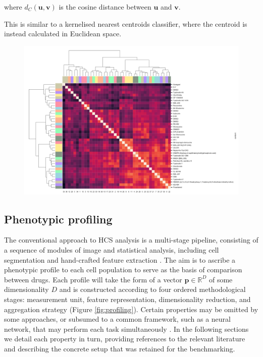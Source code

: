 where $d_{C}(\mathbf{u}, \mathbf{v})$ is the cosine distance between $\mathbf{u}$ and $\mathbf{v}$.

This is similar to a kernelised nearest centroids classifier, where the centroid is instead calculated in Euclidean space.

\begin{figure}
\centering
\includegraphics[width=\textwidth]{img/clustermap.pdf}
\label{fig:clustermap}
\end{figure}

\subsection{Phenotypic profiling}

The conventional approach to HCS analysis is a multi-stage pipeline, consisting of a sequence of modules of image and statistical analysis, including cell segmentation and hand-crafted feature extraction {\cite{Caicedo2017}}. The aim is to ascribe a phenotypic profile to each cell population to serve as the basis of comparison between drugs. Each profile will take the form of a vector $\mathbf{p} \in \mathbb{R}^D$ of some dimensionality $D$ and is constructed according to four ordered methodological stages: measurement unit, feature representation, dimensionality reduction, and aggregation strategy (Figure \ref{fig:profiling}). Certain properties may be omitted by some approaches, or subsumed to a common framework, such as a neural network, that may perform each task simultaneously \cite{kraus2016classifying,godinez2017multi}. In the following sections we detail each property in turn, providing references to the relevant literature and describing the concrete setup that was retained for the benchmarking.

